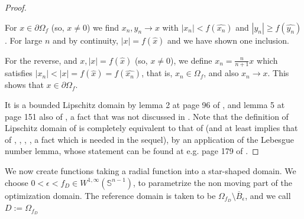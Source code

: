 \documentclass[english,a4paper,12pt,oneside]{scrbook}
\theoremstyle{break}
\newenvironment{mproof}[1][\proofname]{%
  \begin{proof}[#1]$ $\par\nobreak\ignorespaces
}{%
  \end{proof}
}
\renewcommand*{\proofname}{Proof}
\theoremstyle{remark}
\newcommand{\mS}{\mathbb{S}^{n-1}}
\newcommand{\xh}{\hat{x}}
\newcommand{\eps}{\epsilon}
\begin{document}
\begin{mproof}

For $x \in \partial \Omega_f$ (so, $x\neq 0$) we find $x_n, y_n \rightarrow x$ with $|x_n|<f(\widehat{x_n})$ and $|y_n|\geq f(\widehat{y_n})$. For large $n$ and by continuity, $|x| = f(\xh)$ and we have shown one inclusion.

For the reverse, and $x, |x|=f(\xh)$ (so, $x\neq 0$), we define $x_n = \frac{n}{n+1} x$ which satisfies $|x_n|<|x|=f(\xh)=f(\widehat{x_n})$, that is, $x_n \in \Omega_f$, and also $x_n\rightarrow x$. This shows that $x \in \partial \Omega_f$.

It is a bounded Lipschitz domain by lemma 2 at page 96 of \cite{burenkov}, and lemma 5 at page 151 also of \cite{burenkov}, a fact that was not discussed in \cite{deckelnick}. Note that the definition of Lipschitz domain of \cite{burenkov} is completely equivalent to that of \cite{bello} (and at least implies that of \cite{mclean}, \cite{grisvard}, \cite{leoni}, \cite{adams}, a fact which is needed in the sequel), by an application of the Lebesgue number lemma, whose statement can be found at e.g. page 179 of \cite{munkres}.

\end{mproof}

We now create functions taking a radial function into a star-shaped domain. We choose $0<\eps <f_D \in W^{1,\infty}(\mS)$, to parametrize the non moving part of the optimization domain. The reference domain is taken to be $\Omega_{f_D}\setminus \overline{B}_\eps$, and we call $D:=\Omega_{f_D}$
\end{document}
